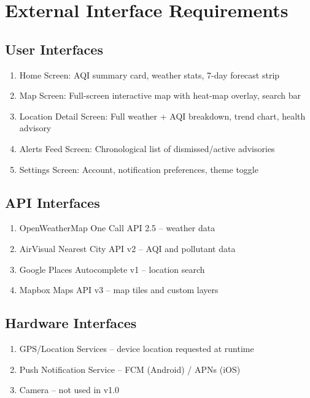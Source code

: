\documentclass[12pt]{article}
\begin{document}
\section{External Interface Requirements}

\subsection{User Interfaces}
\begin{enumerate}
    \item Home Screen: AQI summary card, weather stats, 7-day forecast strip
    \item Map Screen: Full-screen interactive map with heat-map overlay, search bar
    \item Location Detail Screen: Full weather + AQI breakdown, trend chart, health advisory
    \item Alerts Feed Screen: Chronological list of dismissed/active advisories
    \item Settings Screen: Account, notification preferences, theme toggle
\end{enumerate}

\subsection{API Interfaces}
\begin{enumerate}
    \item OpenWeatherMap One Call API 2.5 -- weather data
    \item AirVisual Nearest City API v2 -- AQI and pollutant data
    \item Google Places Autocomplete v1 -- location search
    \item Mapbox Maps API v3 -- map tiles and custom layers
\end{enumerate}

\subsection{Hardware Interfaces}
\begin{enumerate}
    \item GPS/Location Services -- device location requested at runtime
    \item Push Notification Service -- FCM (Android) / APNs (iOS)
    \item Camera -- not used in v1.0
\end{enumerate}
\end{document}

